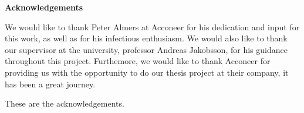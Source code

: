 \newenvironment{acknowledgements}%
    {\cleardoublepage\thispagestyle{empty}\null\vfill\begin{center}%
    \bfseries{\textsf{Acknowledgements}}\end{center}}
    {\vfill\null}
        \begin{acknowledgements}
        
	We would like to thank Peter Almers at Acconeer for his dedication and input for this work, as well as for his infectious enthusiasm. We would also like to thank our supervisor at the university, professor Andreas Jakobsson, for his guidance throughout this project. Furthemore, we would like to thank Acconeer for providing us with the opportunity to do our thesis project at their company, it has been a great journey. 
		
	These are the acknowledgements.
        \end{acknowledgements}
